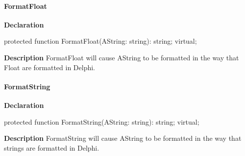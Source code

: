 \documentclass{report}
\newif\ifpdf
\begin{document}
\paragraph*{FormatFloat}\hspace*{\fill}

\label{PasDoc_Gen.TDocGenerator-FormatFloat}
\begin{list}{}{
\setlength{\itemindent}{0cm}
\setlength{\listparindent}{0cm}
\setlength{\leftmargin}{\evensidemargin}
\addtolength{\leftmargin}{\tmplength}
\settowidth{\labelsep}{X}
\addtolength{\leftmargin}{\labelsep}
\setlength{\labelwidth}{\tmplength}
}
\item[\textbf{Declaration}\hfill]
\ifpdf
\begin{flushleft}
\fi
\begin{ttfamily}
protected function FormatFloat(AString: string): string; virtual;\end{ttfamily}

\ifpdf
\end{flushleft}
\fi

\par
\item[\textbf{Description}]
FormatFloat will cause AString to be formatted in the way that Float are formatted in Delphi.

\end{list}
\paragraph*{FormatString}\hspace*{\fill}

\label{PasDoc_Gen.TDocGenerator-FormatString}
\begin{list}{}{
\setlength{\itemindent}{0cm}
\setlength{\listparindent}{0cm}
\setlength{\leftmargin}{\evensidemargin}
\addtolength{\leftmargin}{\tmplength}
\settowidth{\labelsep}{X}
\addtolength{\leftmargin}{\labelsep}
\setlength{\labelwidth}{\tmplength}
}
\item[\textbf{Declaration}\hfill]
\ifpdf
\begin{flushleft}
\fi
\begin{ttfamily}
protected function FormatString(AString: string): string; virtual;\end{ttfamily}

\ifpdf
\end{flushleft}
\fi

\par
\item[\textbf{Description}]
FormatString will cause AString to be formatted in the way that strings are formatted in Delphi.

\end{list}
\end{document}
